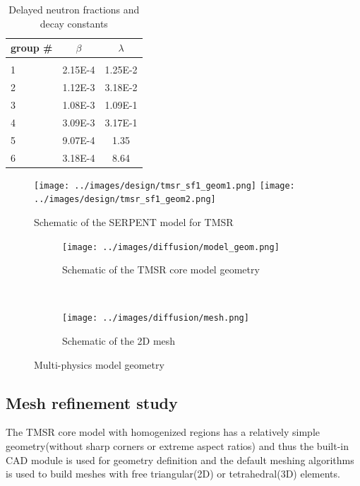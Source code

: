 \documentclass{elsarticle}
\begin{document}
\begin{table}
\caption{Delayed neutron fractions and decay constants}
\centering
    \begin{tabular}[h]{lcc}
      group \# & $\beta$ & $\lambda$\\
      \hline\\
      1 & 2.15E-4 & 1.25E-2\\
      2 & 1.12E-3 & 3.18E-2\\
      3 & 1.08E-3 & 1.09E-1\\
      4 & 3.09E-3 & 3.17E-1\\
      5 & 9.07E-4 & 1.35\\
      6 & 3.18E-4 & 8.64\\
      \hline
    \end{tabular}
  \label{tab:delayed_neutrons}
\end{table}


\begin{figure}
  \centering
  \texttt{[image: ../images/design/tmsr\_sf1\_geom1.png]}
  \texttt{[image: ../images/design/tmsr\_sf1\_geom2.png]}
  \caption{Schematic of the SERPENT model for TMSR}
  \label{fig:serpent}
\end{figure}


\begin{figure}[h]
  \centering
  \begin{subfigure}{0.59\textwidth}
    \texttt{[image: ../images/diffusion/model\_geom.png]}
    \caption{Schematic of the TMSR core model geometry}
  \end{subfigure}
  ~
  \begin{subfigure}{0.35\textwidth}
    \texttt{[image: ../images/diffusion/mesh.png]}
    \caption{Schematic of the 2D mesh}
  \end{subfigure}
  \caption{Multi-physics model geometry}
  \label{fig:model_geom}
\end{figure}




\subsection{Mesh refinement study}
The TMSR core model with homogenized regions has a relatively simple geometry(without sharp corners or extreme aspect ratios) and thus the built-in CAD module is used for geometry definition and the default meshing algorithms is used to build meshes with free triangular(2D) or tetrahedral(3D) elements. 
\end{document}
